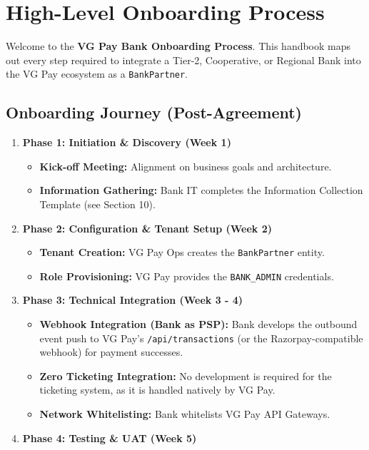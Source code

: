 \documentclass[11pt,a4paper]{article}
\begin{document}
\newpage
\section{High-Level Onboarding Process}

Welcome to the \textbf{VG Pay Bank Onboarding Process}. This handbook maps out every step required to integrate a Tier-2, Cooperative, or Regional Bank into the VG Pay ecosystem as a \texttt{BankPartner}.

\subsection{Onboarding Journey (Post-Agreement)}

\begin{enumerate}
    \item \textbf{Phase 1: Initiation \& Discovery (Week 1)}
    \begin{itemize}
        \item \textbf{Kick-off Meeting:} Alignment on business goals and architecture.
        \item \textbf{Information Gathering:} Bank IT completes the Information Collection Template (see Section 10).
    \end{itemize}
    \item \textbf{Phase 2: Configuration \& Tenant Setup (Week 2)}
    \begin{itemize}
        \item \textbf{Tenant Creation:} VG Pay Ops creates the \texttt{BankPartner} entity.
        \item \textbf{Role Provisioning:} VG Pay provides the \texttt{BANK\_ADMIN} credentials.
    \end{itemize}
    \item \textbf{Phase 3: Technical Integration (Week 3 - 4)}
    \begin{itemize}
        \item \textbf{Webhook Integration (Bank as PSP):} Bank develops the outbound event push to VG Pay's \texttt{/api/transactions} (or the Razorpay-compatible webhook) for payment successes.
        \item \textbf{Zero Ticketing Integration:} No development is required for the ticketing system, as it is handled natively by VG Pay.
        \item \textbf{Network Whitelisting:} Bank whitelists VG Pay API Gateways.
    \end{itemize}
    \item \textbf{Phase 4: Testing \& UAT (Week 5)}

\end{enumerate}
\end{document}
